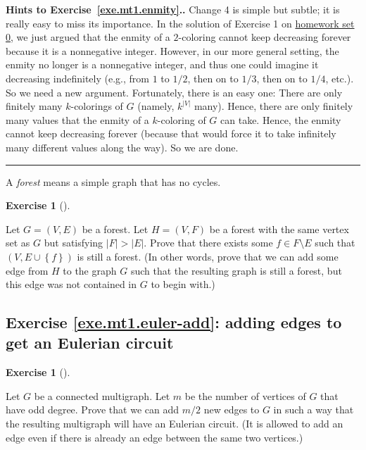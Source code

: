 \documentclass[numbers=enddot,12pt,final,onecolumn,notitlepage]{scrartcl}%
\newcounter{exer}
\theoremstyle{definition}
\newtheorem{exmp}[exer]{Exercise}
\newenvironment{exercise}[1][]
{\begin{exmp}[#1]\begin{leftbar}}
{\end{leftbar}\end{exmp}}
\newenvironment{proof}[1][Proof]{\noindent\textbf{#1.} }{\ \rule{0.5em}{0.5em}}
\newenvironment{noncompile}{}{}
\newcommand{\set}[1]{\left\{ #1 \right\}}
\newcommand{\abs}[1]{\left| #1 \right|}
\newcommand{\tup}[1]{\left( #1 \right)}
\begin{document}
\begin{proof}[Hints to Exercise~\ref{exe.mt1.enmity}.]
Change 4 is simple but subtle; it is really easy to miss its
importance. In the solution of Exercise 1 on
\href{http://www-users.math.umn.edu/~dgrinber/5707s17/hw0s.pdf}{homework set 0},
we just argued that the enmity of a $2$-coloring cannot keep
decreasing forever because it is a nonnegative integer. However, in
our more general setting, the enmity no longer is a nonnegative
integer, and thus one could imagine it decreasing indefinitely
(e.g., from $1$ to
$1/2$, then on to $1/3$, then on to $1/4$, etc.). So we need a new
argument. Fortunately, there is an easy one: There are only finitely
many $k$-colorings of $G$ (namely, $k^{\abs{V}}$ many). Hence, there
are only finitely many values that the enmity of a $k$-coloring of $G$
can take. Hence, the enmity cannot keep decreasing forever (because
that would force it to take infinitely many different values along
the way). So we are done.
\end{proof}

\begin{noncompile}
A \textit{forest} means a simple graph that has no cycles.

\begin{exercise} \label{exe.mt1.forests-matroid}
Let $G = \tup{V, E}$ be a forest. Let $H = \tup{V, F}$ be a forest
with the same vertex set as $G$ but satisfying $\abs{F} > \abs{E}$.
Prove that there exists some $f \in F \setminus E$ such that
$\tup{V, E \cup \set{f}}$ is still a forest. (In other words, prove
that we can add some edge from $H$ to the graph $G$ such that the
resulting graph is still a forest, but this edge was not contained in
$G$ to begin with.)
\end{exercise}
\end{noncompile}

\subsection{Exercise \ref{exe.mt1.euler-add}: adding edges to get an
Eulerian circuit}

\begin{exercise} \label{exe.mt1.euler-add}
Let $G$ be a connected multigraph. Let $m$ be the number of vertices
of $G$ that have odd degree. Prove that we can add $m/2$ new edges to
$G$ in such a way that the resulting multigraph will have an Eulerian
circuit. (It is allowed to add an edge even if there is already an
edge between the same two vertices.)
\end{exercise}
\end{document}
